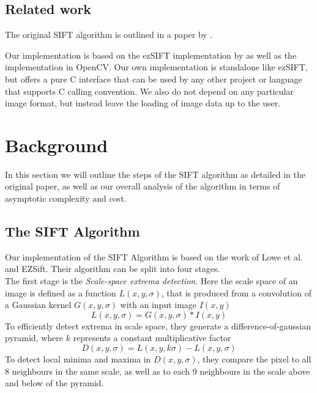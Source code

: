 \documentclass[letterpaper]{article}
\begin{document}
\subsection*{Related work}
The original SIFT algorithm is outlined in a paper by \citet{lowe2004distinctive}\cite{lowe1999object}.

Our implementation is based on the ezSIFT implementation by \citet{ezsift} as well as the implementation in OpenCV\cite{opencv}. Our own implementation is standalone like ezSIFT, but offers a pure C interface that can be used by any other project or language that supports C calling convention. We also do not depend on any particular image format, but instead leave the loading of image data up to the user.

\section{Background}\label{sec:background}
In this section we will outline the steps of the SIFT algorithm as detailed in the original paper\cite{lowe2004distinctive}, as well as our overall analysis of the algorithm in terms of asymptotic complexity and cost.

\subsection*{The SIFT Algorithm}
Our implementation of the SIFT Algorithm is based on the work of Lowe et al.\cite{lowe2004distinctive} and EZSift\cite{ezsift}. Their algorithm can be split into four stages.\\
The first stage is the \emph{Scale-space extrema detection}. Here the scale space of an image is defined as a function $L(x,y,\sigma)$, that is produced from a convolution of a Gaussian kernel $G(x,y,\sigma)$ with an input image $I(x,y)$
\begin{equation}
    L(x,y,\sigma)=G(x,y,\sigma) * I(x,y)
\end{equation}
To efficiently detect extrema in scale space, they generate a difference-of-gaussian pyramid, where $k$ represents a constant multiplicative factor
\begin{equation}
    D(x,y,\sigma) = L(x,y,k\sigma) - L(x,y,\sigma)
\end{equation}
To detect local minima and maxima in $D(x,y,\sigma)$, they compare the pixel to all 8 neighbours in the same scale, as well as to each 9 neighbours in the scale above and below of the pyramid.\\
\end{document}
